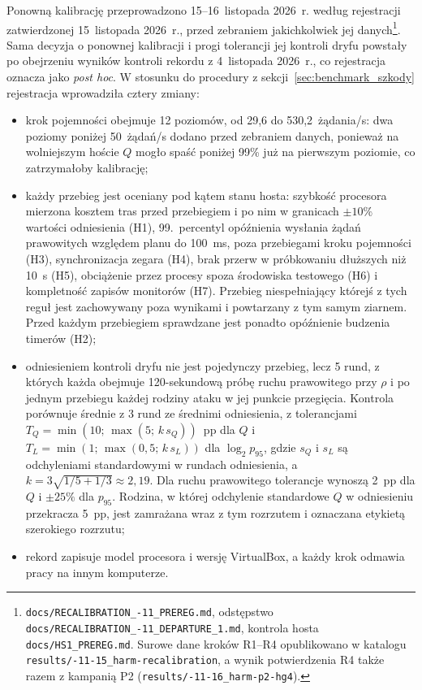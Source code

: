 \documentclass[a4paper,12pt]{article}
\begin{document}
Ponowną kalibrację przeprowadzono 15--16~listopada 2026~r. według rejestracji zatwierdzonej 15~listopada 2026~r., przed zebraniem jakichkolwiek jej danych\footnote{\raggedright \texttt{docs/\allowbreak RECALIBRATION\_-11\_\allowbreak PREREG.md}, odstępstwo \texttt{docs/\allowbreak RECALIBRATION\_-11\_\allowbreak DEPARTURE\_1.md}, kontrola hosta \texttt{docs/\allowbreak HS1\_PREREG.md}. Surowe dane kroków R1--R4 opublikowano w katalogu \texttt{results/-11-15\_\allowbreak harm-\allowbreak recalibration}, a wynik potwierdzenia R4 także razem z kampanią P2 (\texttt{results/-11-16\_\allowbreak harm-p2-hg4}).}. Sama decyzja o ponownej kalibracji i progi tolerancji jej kontroli dryfu powstały po obejrzeniu wyników kontroli rekordu z 4~listopada 2026~r., co rejestracja oznacza jako \textit{post hoc}. W stosunku do procedury z sekcji~\ref{sec:benchmark_szkody} rejestracja wprowadziła cztery zmiany:
\begin{itemize}
    \item krok pojemności obejmuje 12 poziomów, od 29,6 do 530,2~żądania/s: dwa poziomy poniżej 50~żądań/s dodano przed zebraniem danych, ponieważ na wolniejszym hoście $Q$ mogło spaść poniżej 99\% już na pierwszym poziomie, co zatrzymałoby kalibrację;
    \item każdy przebieg jest oceniany pod kątem stanu hosta: szybkość procesora mierzona kosztem tras przed przebiegiem i po nim w granicach $\pm 10\%$ wartości odniesienia (H1), 99.~percentyl opóźnienia wysłania żądań prawowitych względem planu do 100~ms, poza przebiegami kroku pojemności (H3), synchronizacja zegara (H4), brak przerw w próbkowaniu dłuższych niż 10~s (H5), obciążenie przez procesy spoza środowiska testowego (H6) i kompletność zapisów monitorów (H7). Przebieg niespełniający którejś z tych reguł jest zachowywany poza wynikami i powtarzany z tym samym ziarnem. Przed każdym przebiegiem sprawdzane jest ponadto opóźnienie budzenia timerów (H2);
    \item odniesieniem kontroli dryfu nie jest pojedynczy przebieg, lecz 5 rund, z których każda obejmuje 120-sekundową próbę ruchu prawowitego przy $\rho$ i po jednym przebiegu każdej rodziny ataku w jej punkcie przegięcia. Kontrola porównuje średnie z 3 rund ze średnimi odniesienia, z tolerancjami $T_Q = \min(10;\, \max(5;\, k\,s_Q))$~pp dla $Q$ i $T_L = \min(1;\, \max(0{,}5;\, k\,s_L))$ dla $\log_2 p_{95}$, gdzie $s_Q$ i $s_L$ są odchyleniami standardowymi w rundach odniesienia, a $k = 3\sqrt{1/5 + 1/3} \approx 2{,}19$. Dla ruchu prawowitego tolerancje wynoszą 2~pp dla $Q$ i $\pm 25\%$ dla $p_{95}$. Rodzina, w której odchylenie standardowe $Q$ w odniesieniu przekracza 5~pp, jest zamrażana wraz z tym rozrzutem i oznaczana etykietą szerokiego rozrzutu;
    \item rekord zapisuje model procesora i wersję VirtualBox, a każdy krok odmawia pracy na innym komputerze.
\end{itemize}
\end{document}
